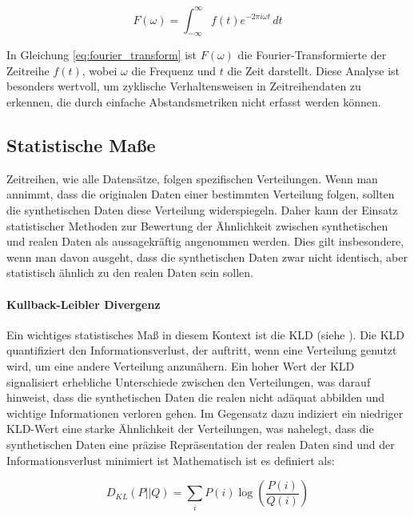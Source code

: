 \begin{equation}
    \label{eq:fourier_transform}
    F(\omega) = \int_{-\infty}^{\infty} f(t) e^{-2\pi i \omega t} \, dt
\end{equation}

In Gleichung \ref{eq:fourier_transform} ist \( F(\omega) \) die Fourier-Transformierte der Zeitreihe \( f(t) \), wobei \( \omega \) die Frequenz und \( t \) die Zeit darstellt. 
Diese Analyse ist besonders wertvoll, um zyklische Verhaltensweisen in Zeitreihendaten zu erkennen, die durch einfache Abstandsmetriken nicht erfasst werden können.


\subsection{Statistische Maße}
\label{sec:statistical_measures}
Zeitreihen, wie alle Datensätze, folgen spezifischen Verteilungen. Wenn man annimmt, dass die originalen Daten einer bestimmten Verteilung folgen, 
sollten die synthetischen Daten diese Verteilung widerspiegeln. Daher kann der Einsatz statistischer Methoden zur Bewertung der Ähnlichkeit zwischen synthetischen und realen Daten als aussagekräftig angenommen werden. 
Dies gilt insbesondere, wenn man davon ausgeht, dass die synthetischen Daten zwar nicht identisch, aber statistisch ähnlich zu den realen Daten sein sollen. 

\paragraph{Kullback-Leibler Divergenz}
Ein wichtiges statistisches Maß in diesem Kontext ist die \acf{KLD} (siehe \cite{Kullback98:online}). Die \ac{KLD} quantifiziert den Informationsverlust, der auftritt, wenn eine Verteilung genutzt wird, um eine andere Verteilung anzunähern. 
Ein hoher Wert der KLD signalisiert erhebliche Unterschiede zwischen den Verteilungen, was darauf hinweist, dass die synthetischen Daten die realen nicht adäquat abbilden und wichtige Informationen verloren gehen. 
Im Gegensatz dazu indiziert ein niedriger KLD-Wert eine starke Ähnlichkeit der Verteilungen, was nahelegt, dass die synthetischen Daten eine präzise Repräsentation der realen Daten sind und der Informationsverlust minimiert ist
Mathematisch ist es definiert als:

\begin{equation}
    \label{eq:kl_divergence}
    D_{KL}(P || Q) = \sum_{i} P(i) \log \left( \frac{P(i)}{Q(i)} \right)
\end{equation}

